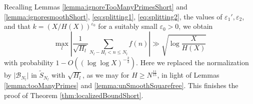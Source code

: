 \documentclass[11pt]{tran-l}
\theoremstyle{definition}
\theoremstyle{remark}
\numberwithin{equation}{section}
\begin{document}
Recalling Lemmas \ref{lemma:ignoreTooManyPrimesShort} and \ref{lemma:ignoresmoothShort}, \eqref{eq:splitting1}, \eqref{eq:splitting2}, the values of $\varepsilon_1', \varepsilon_2$, and that $k = (X/H(X))^{\varepsilon_0}$ for a suitably small $\varepsilon_0>0$, we obtain 
\begin{equation*}
    \max_ l \left\lvert\frac{1}{\sqrt{H_l}}\sum_{N_l - H_l<n\leq N_l } f(n)\right\rvert \gg \sqrt{\log \frac{X}{H(X)}}
\end{equation*}
with probability $1- O((\log\log X)^{-\frac{2}{3}})$. Here we replaced the normalization by $\lvert\mathcal B_{N_l}\rvert$ in $\widetilde S_{N_l}$ with $\sqrt{H_l}$, as we may for $H\geq N^{\frac{11}{15}}$, in light of Lemmas \ref{lemma:tooManyPrimes} and \ref{lemma:unSmoothSquarefree}. This finishes the proof of Theorem \ref{thm:localizedBoundShort}.









\end{document}
